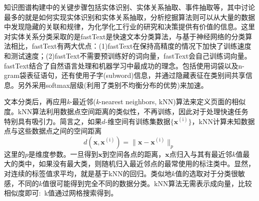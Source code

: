 %
%
%
%
%
知识图谱构建中的关键步骤包括实体识别、实体关系抽取、事件抽取等，其中讨论最多的就是如何实现实体识别和实体关系抽取，分析挖掘算法则可以从大量的数据中发现隐藏的关联和规律，为化学化工行业的研究和决策提供有价值的信息。这里对实体关系分类采取的是\textrm{fastText}是快速文本分类算法，与基于神经网络的分类算法相比，\textrm{fastText}有两大优点：(1)\textrm{fastText}在保持高精度的情况下加快了训练速度和测试速度；(2)\textrm{fastText}不需要预训练好的词向量，\textrm{fastText}会自己训练词向量。
\textrm{fastText}结合了自然语言处理和机器学习中最成功的理念。包括使用词袋以及\textrm{n-gram}袋表征语句，还有使用子字\textrm{(subword)}信息，并通过隐藏表征在类别间共享信息。另外采用\textrm{softmax}层级(利用了类别不均衡分布的优势)来加速。

文本分类后，再应用\textit{k}-最近邻(\textit{k}-\textrm{nearest neighbors, kNN})算法来定义页面的相似度。\textrm{kNN}算法利用数据点空间距离的类似性，不再训练，因此对于处理快速任务特别具有吸引力。简言之，如果$d$-维空间有训练集数据$\{\mathbf{x}^{(\mathrm{i})}\}$，\textrm{kNN}计算未知数据点与这些数据点之间的空间距离
\begin{displaymath}
	d(\mathbf{x},\mathbf{x}^{(\mathrm{i})})=\|\mathbf{x}-\mathbf{x}^{(\mathrm{i})}\|_p
\end{displaymath}
这里的$p$是维度参数。一旦得到$\mathbf{x}$到空间各点的距离，$\mathbf{x}$点归入与其有最近邻$k$值最大的类中，如果没有最大类，则随机归入最近邻点的最常使用的标注类中。显然，对连续的标签值求平均，就是基于\textrm{kNN}的回归。类似地$k$值的选取对于分类很敏感，不同的$k$值很可能得到完全不同的数据分类。\textrm{kNN}算法无需表示成向量，比较相似度即可:~\textrm{k}值通过网格搜索得到。

